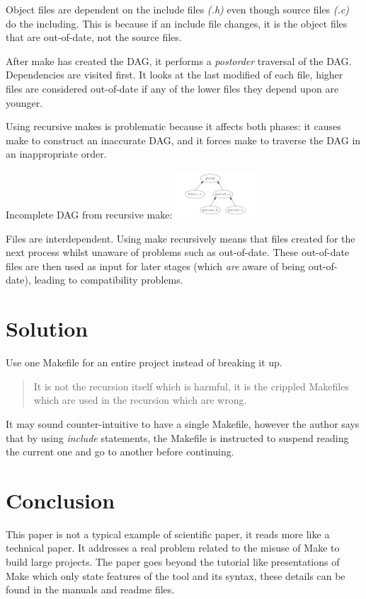 Object files are dependent on the include files \textit{(.h)} even though source files \textit{(.c)} do the including.
This is because if an include file changes, it is the object files that are out-of-date, not the 
source files.

After make has created the DAG, it performs a \textit{postorder} traversal of the DAG. Dependencies are 
visited first. It looks at the last modified of each file, higher files are considered out-of-date if
any of the lower files they depend upon are younger.

Using recursive makes is problematic because it affects both phases: it causes make to construct an
inaccurate DAG, and it forces make to traverse the DAG in an inappropriate order.

Incomplete DAG from recursive make:
\includegraphics[width=3cm]{incompletedag}

Files are interdependent. Using make recursively means that files created for the next process whilst
unaware of problems such as out-of-date. These out-of-date files are then used as input for later stages
(which \textit{are} aware of being out-of-date), leading to compatibility problems.

\section{Solution}

Use one Makefile for an entire project instead of breaking it up.

\begin{quote}
It is not the recursion itself which is harmful, it is the crippled Makefiles which are used
in the recursion which are wrong.
\end{quote}

It may sound counter-intuitive to have a single Makefile, however the author says that by using \textit{include}
statements, the Makefile is instructed to suspend reading the current one and go to another before continuing.

\section{Conclusion}

This paper is not a typical example of scientific paper, it reads more like a
technical paper. It addresses a real problem related to the misuse of Make to build large projects. The paper 
goes beyond the tutorial like presentations of Make which only state features of the tool and its syntax,
these details can be found in the manuals and
readme files.

